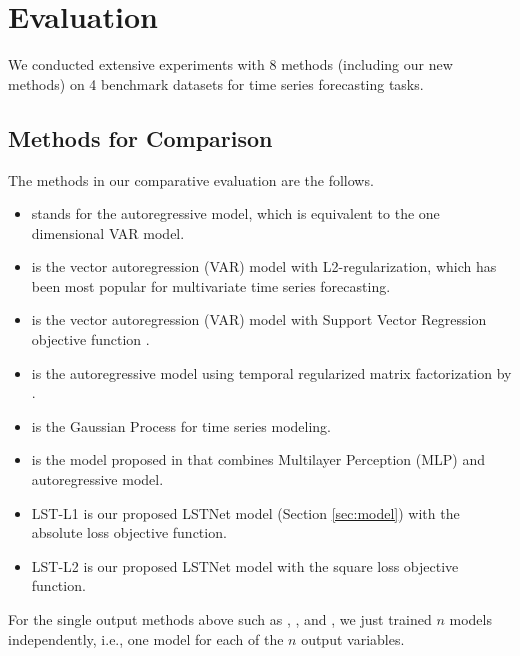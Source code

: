 \section{Evaluation}
\label{sec:experiment}


We conducted extensive experiments with 8 methods (including our new methods) on 4 benchmark datasets for time series forecasting tasks.

\subsection{Methods for Comparison}
\label{sec:baseline}
The methods in our comparative evaluation are the follows.
\begin{itemize}
    \item \AR stands for the autoregressive model, which is equivalent to the one dimensional VAR model. 
    \item \LRidge is the vector autoregression (VAR) model with L2-regularization, which has been most popular for multivariate time series forecasting.
    \item \LSVR is the vector autoregression (VAR) model with Support Vector Regression objective function \cite{vapnik1997support} . 
    \item \TRMF is the autoregressive model using temporal regularized matrix factorization by \cite{Yu_NIPS_16}.
    \item \GP is the Gaussian Process for time series modeling. \cite{frigola2015bayesian,roberts2013gaussian}
    \item \VARMLP is the model proposed in \cite{zhang2003time} that combines Multilayer Perception (MLP) and autoregressive model. 
    \item LST-L1 is our proposed LSTNet model (Section \ref{sec:model}) with the absolute loss objective function.
    \item LST-L2 is our proposed LSTNet model with the square loss objective function.
\end{itemize}
For the single output methods above such as \AR, \LRidge, \LSVR and \GP, we just trained $n$ models independently, i.e., one model for each of the $n$ output variables.

